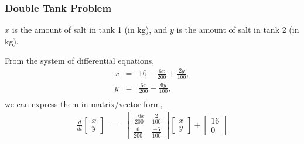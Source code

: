 \begin{frame}
  \frametitle{Double Tank Problem}

    $x$ is the amount of salt in tank 1 (in kg), and $y$ is the amount of salt in tank 2 (in kg).

    From the system of differential equations,
    \begin{eqnarray*}
      \dot{x} & = & 16 - \frac{6x}{200} + \frac{2y}{100}, \\
      \dot{y} & = &  \frac{6x}{200} - \frac{6y}{100}, \\
    \end{eqnarray*}
    we can express them in matrix/vector form,
    \begin{eqnarray*}
      \frac{d}{dt} \left[
        \begin{array}{l}
          x \\ y
        \end{array}
      \right]
      & = & 
      \left[
        \begin{array}{ll}
          \frac{-6x}{200} & \frac{2}{100}  \\ 
          \frac{6}{200}   & \frac{-6}{100} 
        \end{array}
      \right]
      \left[
        \begin{array}{l}
          x \\ y
        \end{array}
        \right]
        +
        \left[
        \begin{array}{l}
          16 \\ 0
        \end{array}
        \right]
    \end{eqnarray*}


\end{frame}




